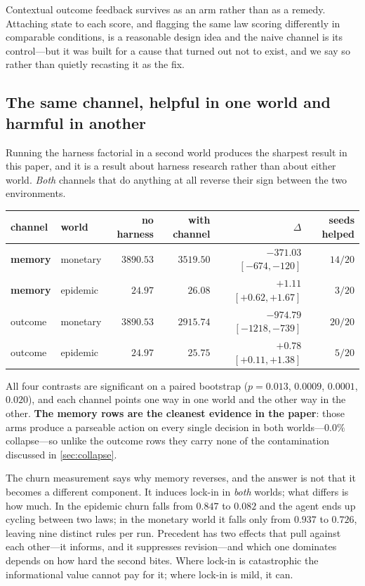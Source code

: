 \documentclass[11pt]{article}
\begin{document}
Contextual outcome feedback survives as an arm rather than as a remedy. Attaching state to each
score, and flagging the same law scoring differently in comparable conditions, is a reasonable
design idea and the naive channel is its control---but it was built for a cause that turned out not
to exist, and we say so rather than quietly recasting it as the fix.

\subsection{The same channel, helpful in one world and harmful in another}
\label{sec:crossworld}

Running the harness factorial in a second world produces the sharpest result in this paper, and it is
a result about harness research rather than about either world. \emph{Both} channels that do anything
at all reverse their sign between the two environments.

\begin{center}\small
\begin{tabular}{@{}llrrrr@{}}
\toprule
channel & world & no harness & with channel & $\Delta$ & seeds helped \\
\midrule
\textbf{memory} & monetary & $3890.53$ & $3519.50$ & $\mathbf{-371.03}$ $[-674, -120]$ & $14/20$ \\
\textbf{memory} & epidemic & $24.97$ & $26.08$ & $\mathbf{+1.11}$ $[+0.62, +1.67]$ & $3/20$ \\
\addlinespace
outcome & monetary & $3890.53$ & $2915.74$ & $-974.79$ $[-1218, -739]$ & $20/20$ \\
outcome & epidemic & $24.97$ & $25.75$ & $+0.78$ $[+0.11, +1.38]$ & $5/20$ \\
\bottomrule
\end{tabular}
\end{center}

All four contrasts are significant on a paired bootstrap ($p = 0.013$, $0.0009$, $0.0001$, $0.020$),
and each channel points one way in one world and the other way in the other. \textbf{The memory rows
are the cleanest evidence in the paper}: those arms produce a parseable action on every single
decision in both worlds---$0.0\%$ collapse---so unlike the outcome rows they carry none of the
contamination discussed in \cref{sec:collapse}.

The churn measurement says why memory reverses, and the answer is not that it becomes a different
component. It induces lock-in in \emph{both} worlds; what differs is how much. In the epidemic churn
falls from $0.847$ to $0.082$ and the agent ends up cycling between two laws; in the monetary world
it falls only from $0.937$ to $0.726$, leaving nine distinct rules per run. Precedent has two effects
that pull against each other---it informs, and it suppresses revision---and which one dominates
depends on how hard the second bites. Where lock-in is catastrophic the informational value cannot
pay for it; where lock-in is mild, it can.
\end{document}

